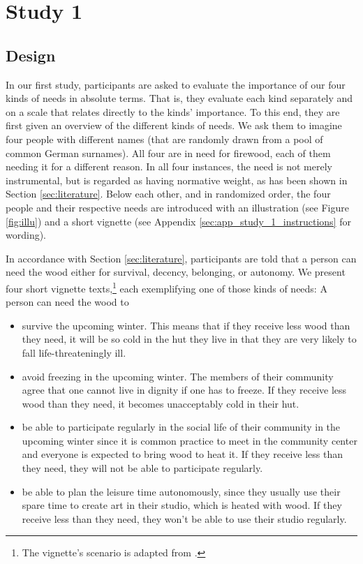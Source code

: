 \documentclass[egregdoesnotlikesansseriftitles]{scrartcl}
\begin{document}
\section{Study 1}\label{sec:study_1}
\subsection{Design}\label{sec:study_1_design}
In our first study, participants are asked to evaluate the importance of our four kinds of needs in absolute terms.
That is, they evaluate each kind separately and on a scale that relates directly to the kinds' importance.
To this end, they are first given an overview of the different kinds of needs.
We ask them to imagine four people with different names (that are randomly drawn from a pool of common German surnames).
All four are in need for firewood, each of them needing it for a different reason.
In all four instances, the need is not merely instrumental, but is regarded as having normative weight, as has been shown in Section \ref{sec:literature}.
Below each other, and in randomized order, the four people and their respective needs are introduced with an illustration (see Figure \ref{fig:illu}) and a short vignette (see Appendix \ref{sec:app_study_1_instructions} for wording).

In accordance with Section \ref{sec:literature}, participants are told that a person can need the wood either for survival, decency, belonging, or autonomy.
We present four short vignette texts,\footnote{The vignette's scenario is adapted from \cite{bauer_need_2022}.} each exemplifying one of those kinds of needs: A person can need the wood to

\begin{itemize}
   \item survive the upcoming winter. This means that if they receive less wood than they need, it will be so cold in the hut they live in that they are very likely to fall life-threateningly ill.
   \item avoid freezing in the upcoming winter. The members of their community agree that one cannot live in dignity if one has to freeze. If they receive less wood than they need, it becomes unacceptably cold in their hut.
   \item be able to participate regularly in the social life of their community in the upcoming winter since it is common practice to meet in the community center and everyone is expected to bring wood to heat it. If they receive less than they need, they will not be able to participate regularly.
   \item be able to plan the leisure time autonomously, since they usually use their spare time to create art in their studio, which is heated with wood. If they receive less than they need, they won't be able to use their studio regularly.
\end{itemize}
\end{document}
